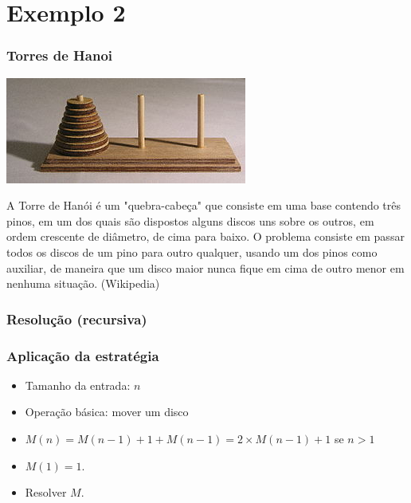 \documentclass[handout]{beamer}
\begin{document}
\section{Exemplo 2}
\begin{frame}
\frametitle{Torres de Hanoi}

\includegraphics{../img/hanoi.jpeg}

A Torre de Hanói é um "quebra-cabeça" que consiste em uma base contendo três
pinos, em um dos quais são dispostos alguns discos uns sobre os outros, em ordem
crescente de diâmetro, de cima para baixo. O problema consiste em passar todos
os discos de um pino para outro qualquer, usando um dos pinos como auxiliar, de
maneira que um disco maior nunca fique em cima de outro menor em nenhuma
situação.  (Wikipedia)

\end{frame}

\begin{frame}
\frametitle{Resolução (recursiva)}



\end{frame}

\begin{frame}
\frametitle{Aplicação da estratégia}

\begin{small}

\end{small}
\begin{itemize}
\item Tamanho da entrada: $n$
\item Operação básica: mover um disco
\item $M(n) = M(n-1) + 1 + M(n-1) = 2 \times M(n-1) + 1$ se $n > 1$
\item $M(1) = 1$.
\item Resolver $M$.
\end{itemize}
\end{frame}
\end{document}

